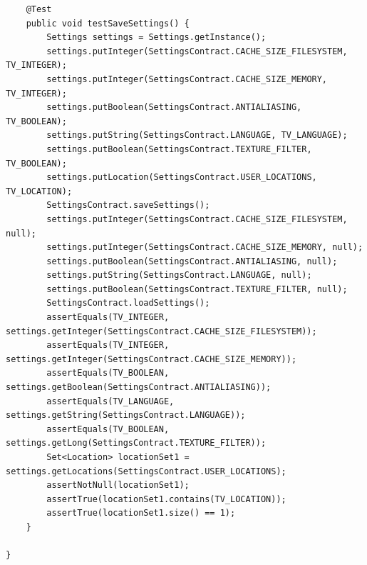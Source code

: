 \documentclass[10pt]{scrreprt}
\begin{document}
\begin{lstlisting}
    @Test
    public void testSaveSettings() {
        Settings settings = Settings.getInstance();
        settings.putInteger(SettingsContract.CACHE_SIZE_FILESYSTEM, TV_INTEGER);
        settings.putInteger(SettingsContract.CACHE_SIZE_MEMORY, TV_INTEGER);
        settings.putBoolean(SettingsContract.ANTIALIASING, TV_BOOLEAN);
        settings.putString(SettingsContract.LANGUAGE, TV_LANGUAGE);
        settings.putBoolean(SettingsContract.TEXTURE_FILTER, TV_BOOLEAN);
        settings.putLocation(SettingsContract.USER_LOCATIONS, TV_LOCATION);
        SettingsContract.saveSettings();
        settings.putInteger(SettingsContract.CACHE_SIZE_FILESYSTEM, null);
        settings.putInteger(SettingsContract.CACHE_SIZE_MEMORY, null);
        settings.putBoolean(SettingsContract.ANTIALIASING, null);
        settings.putString(SettingsContract.LANGUAGE, null);
        settings.putBoolean(SettingsContract.TEXTURE_FILTER, null);
        SettingsContract.loadSettings();
        assertEquals(TV_INTEGER, settings.getInteger(SettingsContract.CACHE_SIZE_FILESYSTEM));
        assertEquals(TV_INTEGER, settings.getInteger(SettingsContract.CACHE_SIZE_MEMORY));
        assertEquals(TV_BOOLEAN, settings.getBoolean(SettingsContract.ANTIALIASING));
        assertEquals(TV_LANGUAGE, settings.getString(SettingsContract.LANGUAGE));
        assertEquals(TV_BOOLEAN, settings.getLong(SettingsContract.TEXTURE_FILTER));
        Set<Location> locationSet1 = settings.getLocations(SettingsContract.USER_LOCATIONS);
        assertNotNull(locationSet1);
        assertTrue(locationSet1.contains(TV_LOCATION));
        assertTrue(locationSet1.size() == 1);
    }

}

\end{lstlisting}
\end{document}
